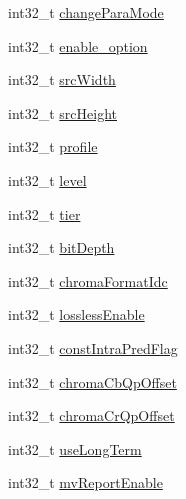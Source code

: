 \begin{DoxyCompactItemize}
\item 
int32\+\_\+t \mbox{\hyperlink{struct__ni__encoder__change__params__t_a91694c8923cc2b3568921d76281a8c7c}{change\+Para\+Mode}}
\item 
int32\+\_\+t \mbox{\hyperlink{struct__ni__encoder__change__params__t_affb0a99e6c4d4898dd36042ed3f38f4a}{enable\+\_\+option}}
\item 
int32\+\_\+t \mbox{\hyperlink{struct__ni__encoder__change__params__t_a8f2c9b9bd3d8563d3d915ca2d18d4a7a}{src\+Width}}
\item 
int32\+\_\+t \mbox{\hyperlink{struct__ni__encoder__change__params__t_a0c3c4fb8168d6830b6b81f0d263fb510}{src\+Height}}
\item 
int32\+\_\+t \mbox{\hyperlink{struct__ni__encoder__change__params__t_affcdae80c74d5751541b067c5ab1a861}{profile}}
\item 
int32\+\_\+t \mbox{\hyperlink{struct__ni__encoder__change__params__t_a89eb5b8aeacf564f248d836e4ea62f8e}{level}}
\item 
int32\+\_\+t \mbox{\hyperlink{struct__ni__encoder__change__params__t_ad2508d8d2585df6bbf886b7143ef6f2a}{tier}}
\item 
int32\+\_\+t \mbox{\hyperlink{struct__ni__encoder__change__params__t_a990931498b038c9b044314f5d28c118f}{bit\+Depth}}
\item 
int32\+\_\+t \mbox{\hyperlink{struct__ni__encoder__change__params__t_aa00ccf2d1615189a25dd59d8c86fdaf1}{chroma\+Format\+Idc}}
\item 
int32\+\_\+t \mbox{\hyperlink{struct__ni__encoder__change__params__t_a1d850cd27f39c5f7f7f9559225b94596}{lossless\+Enable}}
\item 
int32\+\_\+t \mbox{\hyperlink{struct__ni__encoder__change__params__t_a0bcee272b1e72401be02fff9e5c56c6d}{const\+Intra\+Pred\+Flag}}
\item 
int32\+\_\+t \mbox{\hyperlink{struct__ni__encoder__change__params__t_ad0a3befd3ed0ebb0c7003acaa5492922}{chroma\+Cb\+Qp\+Offset}}
\item 
int32\+\_\+t \mbox{\hyperlink{struct__ni__encoder__change__params__t_ae1c87e6385e22b1c0dce6ecf8449c935}{chroma\+Cr\+Qp\+Offset}}
\item 
int32\+\_\+t \mbox{\hyperlink{struct__ni__encoder__change__params__t_afac63ffa92d30f1e84f75b9ee71098f9}{use\+Long\+Term}}
\item 
int32\+\_\+t \mbox{\hyperlink{struct__ni__encoder__change__params__t_a33264641bceee9945774af479acfab37}{mv\+Report\+Enable}}
\item 

\end{DoxyCompactItemize}
